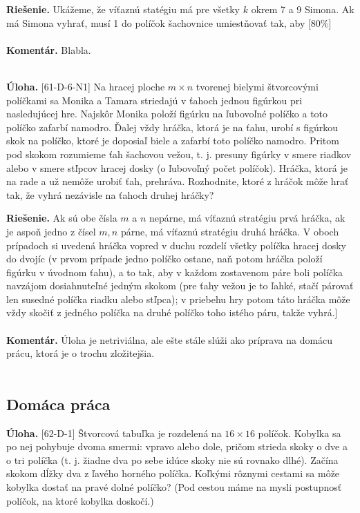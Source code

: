 \documentclass[11pt,a4paper,oneside,final]{book}
\newcommand{\kom}{\textbf{Komentár.} }
\newcommand{\ul}{\textbf{Úloha.} }
\newcommand{\rie}{\textbf{Riešenie.} }
\begin{document}
\rie Ukážeme, že víťaznú statégiu má pre všetky $k$ okrem 7 a 9 Simona. Ak má Simona vyhrať, musí 1 do políčok šachovnice umiestňovať tak, aby [80\%]\\
\\
\kom Blabla.\\
\\
\begin{tcolorbox}[breakable,notitle,boxrule=0pt,colback=light-gray,colframe=light-gray]\ul [61-D-6-N1] Na hracej ploche $m\times n$ tvorenej bielymi štvorcovými políčkami sa Monika a Tamara striedajú v ťahoch jednou figúrkou pri nasledujúcej hre. Najskôr Monika položí figúrku na ľubovoľné políčko a toto políčko zafarbí namodro. Ďalej vždy hráčka, ktorá je na ťahu, urobí s figúrkou skok na políčko, ktoré je doposiaľ biele a zafarbí toto políčko namodro. Pritom pod skokom rozumieme ťah šachovou vežou, t. j. presuny figúrky v smere riadkov alebo v smere stľpcov hracej dosky (o ľubovoľný počet políčok). Hráčka, ktorá je na rade a už nemôže urobiť ťah, prehráva. Rozhodnite, ktoré z hráčok môže hrať tak, že vyhrá nezávisle na ťahoch druhej hráčky?

\end{tcolorbox}

\rie Ak sú obe čísla $m$ a $n$ nepárne, má víťaznú stratégiu prvá hráčka, ak je aspoň jedno z čísel $m, n$ párne, má víťaznú stratégiu druhá hráčka. V oboch prípadoch si uvedená hráčka vopred v duchu rozdelí všetky políčka hracej dosky do dvojíc (v prvom prípade jedno políčko ostane, naň potom hráčka položí figúrku v úvodnom ťahu), a to tak, aby v každom zostavenom páre boli políčka navzájom dosiahnuteľné jedným skokom (pre ťahy vežou je to ľahké, stačí párovať len susedné políčka riadku alebo stľpca); v priebehu hry potom táto hráčka môže vždy skočiť z jedného políčka na druhé políčko toho istého páru, takže vyhrá.]\\
\\
\kom Úloha je netriviálna, ale ešte stále slúži ako príprava na domácu prácu, ktorá je o trochu zložitejšia.\\
\\

\subsection*{Domáca práca}
\begin{tcolorbox}[breakable,notitle,boxrule=0pt,colback=light-gray,colframe=light-gray]\ul [62-D-1]
Štvorcová tabuľka je rozdelená na $16\times16$ políčok. Kobylka sa po nej pohybuje dvoma smermi: vpravo alebo dole, pričom strieda skoky o dve a o tri políčka (t. j. žiadne dva po sebe idúce skoky nie sú rovnako dlhé). Začína skokom dĺžky dva z ľavého horného políčka. Koľkými rôznymi cestami sa môže kobylka dostať na pravé dolné políčko? (Pod cestou máme na mysli postupnosť políčok, na ktoré kobylka doskočí.)

\end{tcolorbox}
\end{document}
